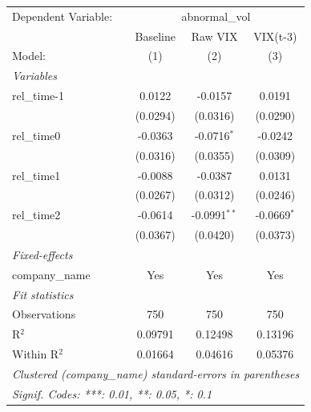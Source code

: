 
\begingroup
\centering
\begin{tabular}{lccc}
   \tabularnewline \midrule \midrule
   Dependent Variable: & \multicolumn{3}{c}{abnormal\_vol}\\
                  & Baseline & Raw VIX        & VIX(t-3) \\   
   Model:         & (1)      & (2)            & (3)\\  
   \midrule
   \emph{Variables}\\
   rel\_time-1    & 0.0122   & -0.0157        & 0.0191\\   
                  & (0.0294) & (0.0316)       & (0.0290)\\   
   rel\_time0     & -0.0363  & -0.0716$^{*}$  & -0.0242\\   
                  & (0.0316) & (0.0355)       & (0.0309)\\   
   rel\_time1     & -0.0088  & -0.0387        & 0.0131\\   
                  & (0.0267) & (0.0312)       & (0.0246)\\   
   rel\_time2     & -0.0614  & -0.0991$^{**}$ & -0.0669$^{*}$\\   
                  & (0.0367) & (0.0420)       & (0.0373)\\   
   \midrule
   \emph{Fixed-effects}\\
   company\_name  & Yes      & Yes            & Yes\\  
   \midrule
   \emph{Fit statistics}\\
   Observations   & 750      & 750            & 750\\  
   R$^2$          & 0.09791  & 0.12498        & 0.13196\\  
   Within R$^2$   & 0.01664  & 0.04616        & 0.05376\\  
   \midrule \midrule
   \multicolumn{4}{l}{\emph{Clustered (company\_name) standard-errors in parentheses}}\\
   \multicolumn{4}{l}{\emph{Signif. Codes: ***: 0.01, **: 0.05, *: 0.1}}\\
\end{tabular}
\par\endgroup


